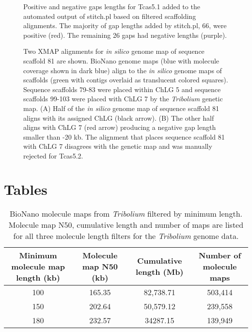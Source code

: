\documentclass{bmcart}
\begin{document}
\begin{backmatter}
\begin{figure}[h!]
\end{figure}  
\begin{figure}[h!]
	\caption{
		Positive and negative gaps lengths for Tcas5.1 added to the automated output of stitch.pl based on filtered scaffolding alignments. The majority of gap lengths added by stitch.pl, 66, were positive (red). The remaining 26 gaps had negative lengths (purple).}
      \end{figure}                      
\begin{figure}[h!]
	\caption{
		Two XMAP alignments for \textit{in silico} genome map of sequence scaffold 81 are shown. BioNano genome maps (blue with molecule coverage shown in dark blue) align to the \textit{in silico} genome maps of scaffolds (green with contigs overlaid as translucent colored squares). Sequence scaffolds 79-83 were placed within ChLG 5 and sequence scaffolds 99-103 were placed with ChLG 7 by the \textit{Tribolium} genetic map. (A) Half of the \textit{in silico} genome map of sequence scaffold 81 aligns with its assigned ChLG (black arrow). (B) The other half aligns with ChLG 7 (red arrow) producing a negative gap length smaller than -20 kb. The alignment that places sequence scaffold 81 with ChLG 7 disagrees with the genetic map and was manually rejected for Tcas5.2.}
      \end{figure}            




\section*{Tables}

\begin{table}[h!]
\caption{BioNano molecule maps from \textit{Tribolium} filtered by minimum length. Molecule map N50, cumulative length and number of maps are listed for all three molecule length filters for the \textit{Tribolium} genome data.}
      \begin{tabular}{cccc}
        \hline
         Minimum molecule map length (kb) & Molecule map N50 (kb) & Cumulative length (Mb) & Number of molecule maps\\ \hline
        100 & 165.35 & 82,738.71 & 503,414 \\
        150 & 202.64 & 50,579.12 & 239,558 \\ 
        180 & 232.57 & 34287.15 & 139,949 \\ \hline  
      \end{tabular}
\end{table}


\end{backmatter}
\end{document}
